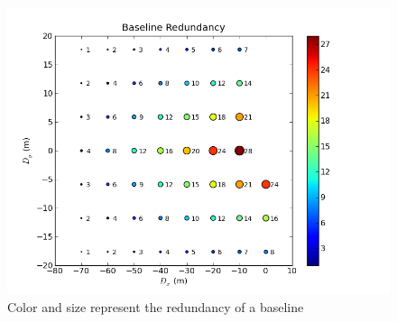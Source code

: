 \documentclass[useAMS]{mn2e}
\begin{document}
\begin{figure}
    \centering
    \includegraphics[scale=0.4]{redbl.png}
    \caption{Color and size represent the redundancy of a baseline}
\end{figure}
\end{document}
